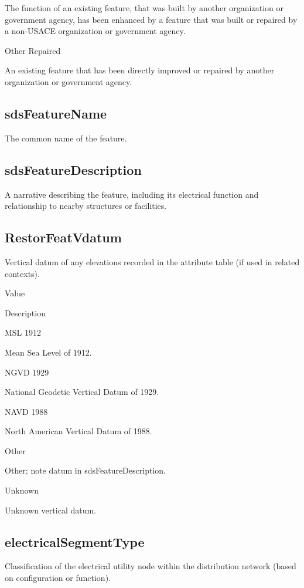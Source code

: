 \documentclass[
  letterpaper,
  DIV=11,
  numbers=noendperiod]{scrreprt}
\begin{document}
The function of an existing feature, that was built by another
organization or government agency, has been enhanced by a feature that
was built or repaired by a non-USACE organization or government agency.

Other Repaired

An existing feature that has been directly improved or repaired by
another organization or government agency.

\subsection{sdsFeatureName}\label{sdsfeaturename-19}

The common name of the feature.

\subsection{sdsFeatureDescription}\label{sdsfeaturedescription-19}

A narrative describing the feature, including its electrical function
and relationship to nearby structures or facilities.

\subsection{RestorFeatVdatum}\label{restorfeatvdatum-19}

Vertical datum of any elevations recorded in the attribute table (if
used in related contexts).

Value

Description

MSL 1912

Mean Sea Level of 1912.

NGVD 1929

National Geodetic Vertical Datum of 1929.

NAVD 1988

North American Vertical Datum of 1988.

Other

Other; note datum in sdsFeatureDescription.

Unknown

Unknown vertical datum.

\subsection{electricalSegmentType}\label{electricalsegmenttype}

Classification of the electrical utility node within the distribution
network (based on configuration or function).
\end{document}
